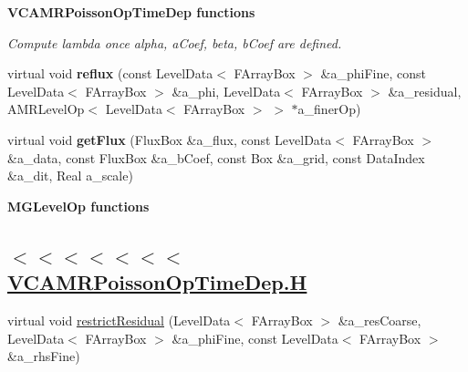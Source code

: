 \begin{Indent}{\bf V\-C\-A\-M\-R\-Poisson\-Op\-Time\-Dep functions}
\begin{DoxyCompactItemize}
\begin{DoxyCompactList}\small\item\em Compute lambda once alpha, a\-Coef, beta, b\-Coef are defined. \end{DoxyCompactList}\item 
\hypertarget{class_v_c_a_m_r_poisson_op_time_dep_a9d3b121914e132f0618b896a819295ce}{virtual void {\bfseries reflux} (const Level\-Data$<$ F\-Array\-Box $>$ \&a\-\_\-phi\-Fine, const Level\-Data$<$ F\-Array\-Box $>$ \&a\-\_\-phi, Level\-Data$<$ F\-Array\-Box $>$ \&a\-\_\-residual, A\-M\-R\-Level\-Op$<$ Level\-Data$<$ F\-Array\-Box $>$ $>$ $\ast$a\-\_\-finer\-Op)}\label{class_v_c_a_m_r_poisson_op_time_dep_a9d3b121914e132f0618b896a819295ce}

\item 
\hypertarget{class_v_c_a_m_r_poisson_op_time_dep_add28dc0af026cf0b01361c53c74f1e9d}{virtual void {\bfseries get\-Flux} (Flux\-Box \&a\-\_\-flux, const Level\-Data$<$ F\-Array\-Box $>$ \&a\-\_\-data, const Flux\-Box \&a\-\_\-b\-Coef, const Box \&a\-\_\-grid, const Data\-Index \&a\-\_\-dit, Real a\-\_\-scale)}\label{class_v_c_a_m_r_poisson_op_time_dep_add28dc0af026cf0b01361c53c74f1e9d}

\end{DoxyCompactItemize}
\end{Indent}
\begin{Indent}{\bf M\-G\-Level\-Op functions}\par
{\em \subsection*{$<$$<$$<$$<$$<$$<$$<$ \hyperlink{_v_c_a_m_r_poisson_op_time_dep_8_h_source}{V\-C\-A\-M\-R\-Poisson\-Op\-Time\-Dep.\-H} }}\begin{DoxyCompactItemize}
\item 
virtual void \hyperlink{class_v_c_a_m_r_poisson_op_time_dep_a7fe1d2bd79bf215be7338f58f3840444}{restrict\-Residual} (Level\-Data$<$ F\-Array\-Box $>$ \&a\-\_\-res\-Coarse, Level\-Data$<$ F\-Array\-Box $>$ \&a\-\_\-phi\-Fine, const Level\-Data$<$ F\-Array\-Box $>$ \&a\-\_\-rhs\-Fine)
\end{DoxyCompactItemize}
\end{Indent}

